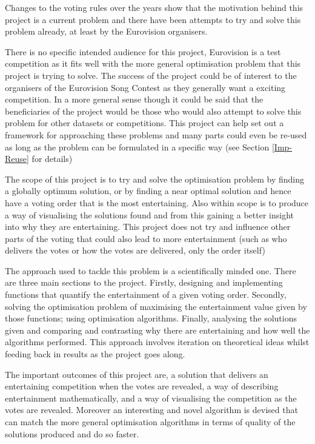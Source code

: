 \documentclass[12pt]{report}
\begin{document}
Changes to the voting rules over the years show that the motivation behind this project is a current problem and there have been attempts to try and solve this problem already, at least by the Eurovision organisers.

There is no specific intended audience for this project, Eurovision is a test competition as it fits well with the more general optimisation problem that this project is trying to solve. The success of the project could be of interest to the organisers of the Eurovision Song Contest as they generally want a exciting competition. In a more general sense though it could be said that the beneficiaries of the project would be those who would also attempt to solve this problem for other datasets or competitions. This project can help set out a framework for approaching these problems and many parts could even be re-used as long as the problem can be formulated in a specific way (see Section \ref{Imp-Reuse} for details)

The scope of this project is to try and solve the optimisation problem by finding a globally optimum solution, or by finding a near optimal solution and hence have a voting order that is the most entertaining. Also within scope is to produce a way of visualising the solutions found and from this gaining a better insight into why they are entertaining. This project does not try and influence other parts of the voting that could also lead to more entertainment (such as who delivers the votes or  how the votes are delivered, only the order itself)

The approach used to tackle this problem is a scientifically minded one. There are three main sections to the project. Firstly, designing and implementing functions that quantify the entertainment of a given voting order. Secondly, solving the optimisation problem of maximising the entertainment value given by those functions; using optimisation algorithms. Finally, analysing the solutions given and comparing and contrasting why there are entertaining and how well the algorithms performed. This approach involves iteration on theoretical ideas whilst feeding back in results as the project goes along.

The important outcomes of this project are, a solution that delivers an entertaining competition when the votes are revealed, a way of describing entertainment mathematically, and a way of visualising the competition as the votes are revealed. Moreover an interesting and novel algorithm is devised that can match the more general optimisation algorithms in terms of quality of the solutions produced and do so faster.
\end{document}

